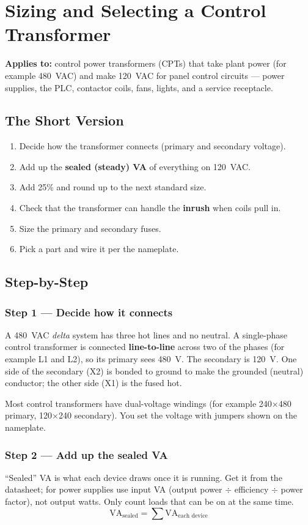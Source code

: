 \chapter{Sizing and Selecting a Control Transformer}
\label{app:transformer-sizing}

\textbf{Applies to:} control power transformers (CPTs) that take plant power (for example 480~VAC) and make 120~VAC for panel control circuits --- power supplies, the PLC, contactor coils, fans, lights, and a service receptacle.

\section{The Short Version}
\begin{enumerate}[itemsep=2pt]
  \item Decide how the transformer connects (primary and secondary voltage).
  \item Add up the \textbf{sealed (steady) VA} of everything on 120~VAC.
  \item Add 25\% and round up to the next standard size.
  \item Check that the transformer can handle the \textbf{inrush} when coils pull in.
  \item Size the primary and secondary fuses.
  \item Pick a part and wire it per the nameplate.
\end{enumerate}

\section{Step-by-Step}
\subsection*{Step 1 --- Decide how it connects}
A 480~VAC \emph{delta} system has three hot lines and no neutral. A single-phase control transformer is connected \textbf{line-to-line} across two of the phases (for example L1 and L2), so its primary sees 480~V. The secondary is 120~V. One side of the secondary (X2) is bonded to ground to make the grounded (neutral) conductor; the other side (X1) is the fused hot.

Most control transformers have dual-voltage windings (for example 240$\times$480 primary, 120$\times$240 secondary). You set the voltage with jumpers shown on the nameplate.

\subsection*{Step 2 --- Add up the sealed VA}
``Sealed'' VA is what each device draws once it is running. Get it from the datasheet; for power supplies use input VA (output power $\div$ efficiency $\div$ power factor), not output watts. Only count loads that can be on at the same time.
\[
  \text{VA}_{\text{sealed}} = \sum \text{VA}_{\text{each device}}
\]

